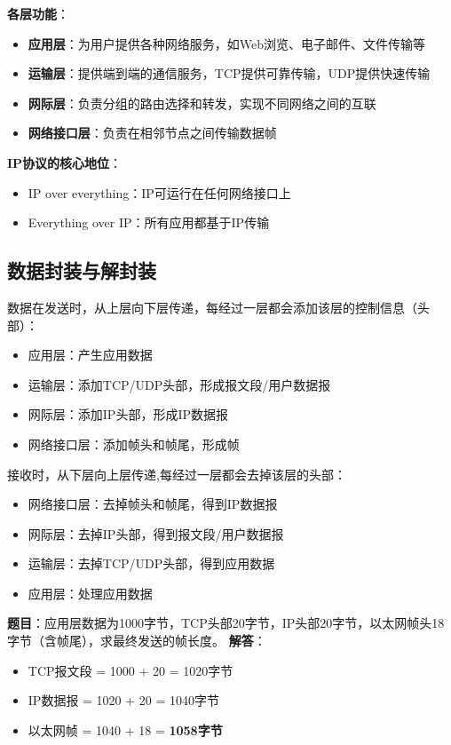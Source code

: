 \textbf{各层功能}：
\begin{itemize}[leftmargin=2em,itemsep=0pt]
    \item \textbf{应用层}：为用户提供各种网络服务，如Web浏览、电子邮件、文件传输等
    \item \textbf{运输层}：提供端到端的通信服务，TCP提供可靠传输，UDP提供快速传输
    \item \textbf{网际层}：负责分组的路由选择和转发，实现不同网络之间的互联
    \item \textbf{网络接口层}：负责在相邻节点之间传输数据帧
\end{itemize}

\begin{notebox}
\textbf{IP协议的核心地位}：
\begin{itemize}[itemsep=0pt]
    \item IP over everything：IP可运行在任何网络接口上
    \item Everything over IP：所有应用都基于IP传输
\end{itemize}
\end{notebox}

\subsection{数据封装与解封装}
数据在发送时，从上层向下层传递，每经过一层都会添加该层的控制信息（头部）：
\begin{itemize}[leftmargin=2em,itemsep=0pt]
    \item 应用层：产生应用数据
    \item 运输层：添加TCP/UDP头部，形成报文段/用户数据报
    \item 网际层：添加IP头部，形成IP数据报
    \item 网络接口层：添加帧头和帧尾，形成帧
\end{itemize}

接收时，从下层向上层传递,每经过一层都会去掉该层的头部：
\begin{itemize}[leftmargin=2em,itemsep=0pt]
    \item 网络接口层：去掉帧头和帧尾，得到IP数据报
    \item 网际层：去掉IP头部，得到报文段/用户数据报
    \item 运输层：去掉TCP/UDP头部，得到应用数据
    \item 应用层：处理应用数据
\end{itemize}

\begin{examplebox}[例题1.3 数据封装]
\textbf{题目}：应用层数据为1000字节，TCP头部20字节，IP头部20字节，以太网帧头18字节（含帧尾），求最终发送的帧长度。
\tcblower
\textbf{解答}：
\begin{itemize}[itemsep=0pt]
    \item TCP报文段 = 1000 + 20 = 1020字节
    \item IP数据报 = 1020 + 20 = 1040字节
    \item 以太网帧 = 1040 + 18 = \textbf{1058字节}
\end{itemize}
\end{examplebox}

